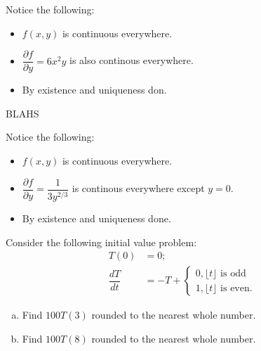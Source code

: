 \documentclass{article}
\begin{document}
\begin{solution}[Problem 1aI]
    Notice the following:
    \begin{itemize}
        \item $f(x,y)$ is continuous everywhere.
        \item $\dfrac{\partial f}{\partial y} = 6x^2y$ is also continous everywhere.
        \item By existence and uniqueness don.
    \end{itemize}
\end{solution}
\begin{solution}
    BLAHS
\end{solution}
\begin{solution}[Problem 1bI]
    Notice the following:
    \begin{itemize}
        \item $f(x,y)$ is continuous everywhere.
        \item $\dfrac{\partial f}{\partial y} = \dfrac{1}{3y^{2/3}}$ is continous everywhere except $y=0$.
        \item By existence and uniqueness done.
    \end{itemize}
\end{solution}
\begin{problem}[Problem 3]
    
\end{problem}
\begin{solution*}
    
\end{solution*}
\begin{problem}
    Consider the following initial value problem:
    \begin{align}
        T(0) &= 0; \\ 
        \dfrac{dT}{dt} &= -T + 
        \begin{cases}
            0, \lfloor t \rfloor \text{ is odd} \\ 
            1, \lfloor t \rfloor \text{ is even.}
        \end{cases}
    \end{align}
    \begin{enumerate}[(a)]
        \item Find $100T(3)$ rounded to the nearest whole number.
        \item Find $100T(8)$ rounded to the nearest whole number.
    \end{enumerate}
\end{problem}
\end{document}
